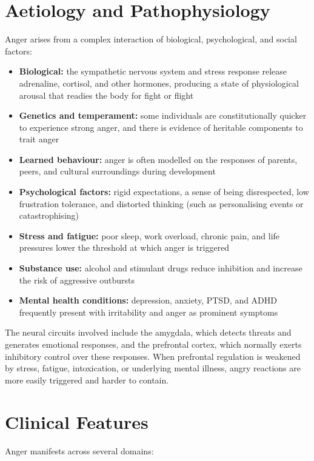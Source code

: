 \section*{Aetiology and Pathophysiology}
Anger arises from a complex interaction of biological, psychological, and social factors:

\begin{itemize}
    \item \textbf{Biological:} the sympathetic nervous system and stress response release adrenaline, cortisol, and other hormones, producing a state of physiological arousal that readies the body for fight or flight
    \item \textbf{Genetics and temperament:} some individuals are constitutionally quicker to experience strong anger, and there is evidence of heritable components to trait anger
    \item \textbf{Learned behaviour:} anger is often modelled on the responses of parents, peers, and cultural surroundings during development
    \item \textbf{Psychological factors:} rigid expectations, a sense of being disrespected, low frustration tolerance, and distorted thinking (such as personalising events or catastrophising)
    \item \textbf{Stress and fatigue:} poor sleep, work overload, chronic pain, and life pressures lower the threshold at which anger is triggered
    \item \textbf{Substance use:} alcohol and stimulant drugs reduce inhibition and increase the risk of aggressive outbursts
    \item \textbf{Mental health conditions:} depression, anxiety, PTSD, and ADHD frequently present with irritability and anger as prominent symptoms
\end{itemize}

The neural circuits involved include the amygdala, which detects threats and generates emotional responses, and the prefrontal cortex, which normally exerts inhibitory control over these responses. When prefrontal regulation is weakened by stress, fatigue, intoxication, or underlying mental illness, angry reactions are more easily triggered and harder to contain.

\section*{Clinical Features}
Anger manifests across several domains:

